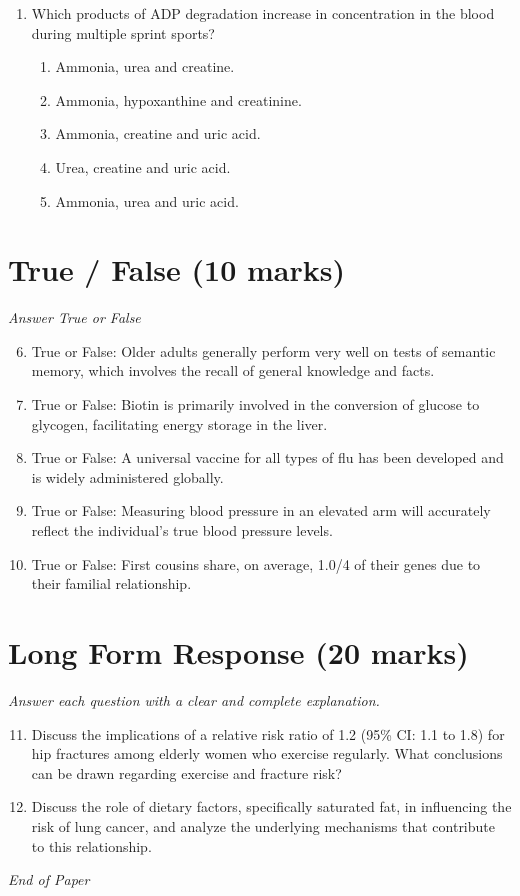 \documentclass[12pt]{article}
\begin{document}
\begin{enumerate}[label=\arabic*.]
\begin{enumerate}[label=(\alph*)]
    \item Deep pyro sequencing (NGS)
    \item Monoclonal antibody techniques
\end{enumerate}
\item Which products of ADP degradation increase in concentration in the blood during multiple sprint sports?
\begin{enumerate}[label=(\alph*)]
    \item Ammonia, urea and creatine.
    \item Ammonia, hypoxanthine and creatinine.
    \item Ammonia, creatine and uric acid.
    \item Urea, creatine and uric acid.
    \item Ammonia, urea and uric acid.
\end{enumerate}
\end{enumerate}

\section*{True / False (10 marks)}
\textit{Answer True or False}
\begin{enumerate}[label=\arabic*.]
\setcounter{enumi}{5}
\item True or False: Older adults generally perform very well on tests of semantic memory, which involves the recall of general knowledge and facts.
\item True or False: Biotin is primarily involved in the conversion of glucose to glycogen, facilitating energy storage in the liver.
\item True or False: A universal vaccine for all types of flu has been developed and is widely administered globally.
\item True or False: Measuring blood pressure in an elevated arm will accurately reflect the individual's true blood pressure levels.
\item True or False: First cousins share, on average, 1.0/4 of their genes due to their familial relationship.
\end{enumerate}

\section*{Long Form Response (20 marks)}
\textit{Answer each question with a clear and complete explanation.}
\begin{enumerate}[label=\arabic*.]
\setcounter{enumi}{10}
\item Discuss the implications of a relative risk ratio of 1.2 (95\% CI: 1.1 to 1.8) for hip fractures among elderly women who exercise regularly. What conclusions can be drawn regarding exercise and fracture risk?
\item Discuss the role of dietary factors, specifically saturated fat, in influencing the risk of lung cancer, and analyze the underlying mechanisms that contribute to this relationship.
\end{enumerate}

\vfill
\noindent\textit{End of Paper}
\end{document}
